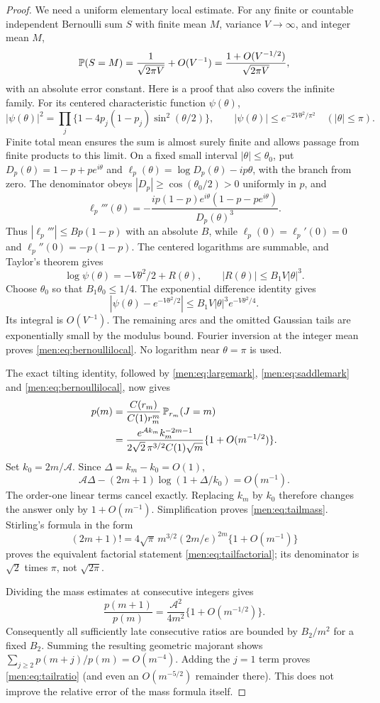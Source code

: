 \documentclass[11pt,letterpaper]{article}
\theoremstyle{remark}\newtheorem{remark}[theorem]{Remark}
\begin{document}
\begin{proof}
We need a uniform elementary local estimate. For any finite or countable independent Bernoulli sum $S$ with finite mean $M$, variance $V\to\infty$, and integer mean $M$,
\begin{equation}\label{men:eq:bernoullilocal}
 \mathbb P(S=M)=\frac1{\sqrt{2\pi V}}+O(V^{-1})
         =\frac{1+O(V^{-1/2})}{\sqrt{2\pi V}},
\end{equation}
with an absolute error constant. Here is a proof that also covers the infinite family. For its centered characteristic function $\psi(\theta)$,
\[
 |\psi(\theta)|^2=\prod_j\{1-4p_j(1-p_j)\sin^2(\theta/2)\},\qquad
 |\psi(\theta)|\le e^{-2V\theta^2/\pi^2}\quad(|\theta|\le\pi).
\]
Finite total mean ensures the sum is almost surely finite and allows passage from finite products to this limit. On a fixed small interval $|\theta|\le\theta_0$, put
$D_p(\theta)=1-p+pe^{i\theta}$ and
$\ell_p(\theta)=\log D_p(\theta)-ip\theta$, with the branch from zero. The denominator obeys $|D_p|\ge\cos(\theta_0/2)>0$ uniformly in $p$, and
\[
 \ell_p'''(\theta)=
 -\frac{ip(1-p)e^{i\theta}(1-p-pe^{i\theta})}{D_p(\theta)^3}.
\]
Thus $|\ell_p'''|\le Bp(1-p)$ with an absolute $B$, while
$\ell_p(0)=\ell_p'(0)=0$ and $\ell_p''(0)=-p(1-p)$. The centered logarithms are summable, and Taylor's theorem gives
\[
 \log\psi(\theta)=-V\theta^2/2+R(\theta),\qquad
 |R(\theta)|\le B_1V|\theta|^3.
\]
Choose $\theta_0$ so that $B_1\theta_0\le1/4$. The exponential difference identity gives
\[
 |\psi(\theta)-e^{-V\theta^2/2}|
       \le B_1V|\theta|^3e^{-V\theta^2/4}.
\]
Its integral is $O(V^{-1})$. The remaining arcs and the omitted Gaussian tails are exponentially small by the modulus bound. Fourier inversion at the integer mean proves \eqref{men:eq:bernoullilocal}. No logarithm near $\theta=\pi$ is used.

The exact tilting identity, followed by \eqref{men:eq:largemark}, \eqref{men:eq:saddlemark} and \eqref{men:eq:bernoullilocal}, now gives
\begin{align*}
 p(m)&=\frac{C(r_m)}{C(1)r_m^m}\,\mathbb P_{r_m}(J=m)\\
 &=\frac{e^{\mathcal A k_m}k_m^{-2m-1}}
           {2\sqrt2\,\pi^{3/2}C(1)\sqrt m}\{1+O(m^{-1/2})\}.
\end{align*}
Set $k_0=2m/\mathcal A$. Since $\Delta=k_m-k_0=O(1)$,
\[
 \mathcal A\Delta-(2m+1)\log(1+\Delta/k_0)=O(m^{-1}).
\]
The order-one linear terms cancel exactly. Replacing $k_m$ by $k_0$ therefore changes the answer only by $1+O(m^{-1})$. Simplification proves \eqref{men:eq:tailmass}. Stirling's formula in the form
\[
 (2m+1)!=4\sqrt\pi\,m^{3/2}(2m/e)^{2m}\{1+O(m^{-1})\}
\]
proves the equivalent factorial statement \eqref{men:eq:tailfactorial}; its denominator is $\sqrt2$ times $\pi$, not $\sqrt{2\pi}$.

Dividing the mass estimates at consecutive integers gives
\[
 \frac{p(m+1)}{p(m)}=\frac{\mathcal A^2}{4m^2}\{1+O(m^{-1/2})\}.
\]
Consequently all sufficiently late consecutive ratios are bounded by $B_2/m^2$ for a fixed $B_2$. Summing the resulting geometric majorant shows
$\sum_{j\ge2}p(m+j)/p(m)=O(m^{-4})$. Adding the $j=1$ term proves \eqref{men:eq:tailratio} (and even an $O(m^{-5/2})$ remainder there). This does not improve the relative error of the mass formula itself.
\end{proof}
\end{document}
